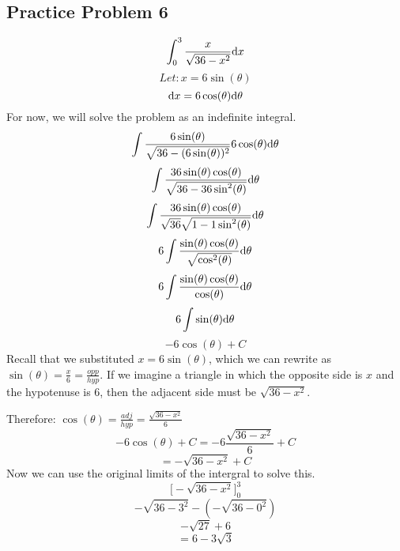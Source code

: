 \documentclass[letterpaper, 12pt]{math}
\begin{document}
\subsection*{Practice Problem 6}
\[ \int_{0}^{3}{\frac{x}{\sqrt{36-x^{2}}}\mathrm{d}{x}} \]
\[ Let: x = 6\sin(\theta) \]
\[ \mathrm{d}{x} = 6\cos(\theta)\mathrm{d}{\theta} \]
For now, we will solve the problem as an indefinite integral.
\[ \int{\frac{6\sin(\theta)}
   {\sqrt{36-(6\sin(\theta))^{2}}}6\cos(\theta)\mathrm{d}{\theta}} \]
\[ \int{\frac{36\sin(\theta)\cos(\theta)}
   {\sqrt{36-36\sin^{2}(\theta)}}\mathrm{d}{\theta}} \]
\[ \int{\frac{36\sin(\theta)\cos(\theta)}
   {\sqrt{36}\sqrt{1-1\sin^{2}(\theta)}}\mathrm{d}{\theta}} \]
\[ 6\int{\frac{\sin(\theta)\cos(\theta)}
   {\sqrt{\cos^{2}(\theta)}}\mathrm{d}{\theta}} \]
\[ 6\int{\frac{\sin(\theta)\cos(\theta)}
   {\cos(\theta)}\mathrm{d}{\theta}} \]
\[ 6\int{\sin(\theta)\mathrm{d}{\theta}} \]
\[ -6\cos(\theta)+C \]
Recall that we substituted \( x = 6\sin(\theta) \), which we can rewrite as
\( \sin(\theta) = \frac{x}{6} = \frac{opp}{hyp} \). If we imagine a triangle in
which the opposite side is \( x \) and the hypotenuse is 6, then the adjacent
side must be \( \sqrt{36-x^{2}} \).
\begin{center}
\end{center}
Therefore: \( \cos(\theta) = \frac{adj}{hyp} = \frac{\sqrt{36-x^{2}}}{6} \)
\[ -6\cos(\theta)+C = -6\frac{\sqrt{36-x^{2}}}{6}+C \]
\[ = -\sqrt{36-x^{2}}+C \]
Now we can use the original limits of the intergral to solve this.
\[ \bigg[-\sqrt{36-x^{2}}\bigg]_{0}^{3} \]
\[ -\sqrt{36-3^{2}}-(-\sqrt{36-0^{2}}) \]
\[ -\sqrt{27}+6 \]
\[ = 6-3\sqrt{3} \]
\end{document}
